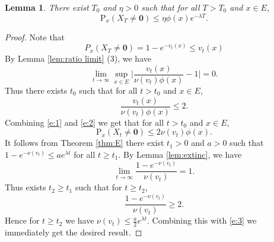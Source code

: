 \documentclass[12pt,a4paper]{amsart}
\numberwithin{equation}{section}
\theoremstyle{plain}
\newtheorem{lem}[thm]{Lemma}
\theoremstyle{definition}
\theoremstyle{remark}
\begin{document}
\begin{lem}\label{l:new}
There exist $T_0$ and $\eta>0$ such that for all $T>T_0$ and $x\in E$,
$$
\mathrm P_x (X_T\neq\mathbf 0)\le \eta\phi(x)e^{-\lambda T}.
$$
\end{lem}
\begin{proof}
Note that
\begin{equation}\label{e:1}
P_x (X_T\neq\mathbf 0)=1-e^{-v_t(x)}\le v_t(x)
\end{equation}
By Lemma \ref{lem:ratio limit} (3), we have
$$
\lim_{t\to\infty}\sup_{x\in E}\Big|\frac{v_t(x)}{\nu(v_t)\phi(x)}-1\Big|=0.
$$
Thus there exists $t_0$ such that for all $t>t_0$ and $x\in E$,
\begin{equation}\label{e:2}
\frac{v_t(x)}{\nu(v_t)\phi(x)}\le 2.
\end{equation}
Combining \eqref{e:1} and \eqref{e:2} we get that  for all $t>t_0$ and $x\in E$,
\begin{equation}\label{e:3}
\mathrm P_x (X_t\neq\mathbf 0)\le 2 \nu(v_t)\phi(x).
\end{equation}
It follows from Theorem \ref{thm:E} there exist $t_1>0$ and $a>0$ such that 
$1-e^{-\nu(v_t)}\le a e^{\lambda t}$ for all $t\ge t_1$. By Lemma \ref{lem:extinc},
we have
$$
\lim_{t\to\infty}\frac{1-e^{-\nu(v_t)}}{\nu(v_t)}=1.
$$
Thus exists $t_2\ge t_1$ such that for $t\ge t_2$,
$$
\frac{1-e^{-\nu(v_t)}}{\nu(v_t)}\ge 2.
$$
Hence for $t\ge t_2$ we have $\nu(v_t)\le\frac{a}2e^{\lambda t}$.
Combining this with \eqref{e:3} we immediately get the desired result.
\end{proof}
\end{document}
